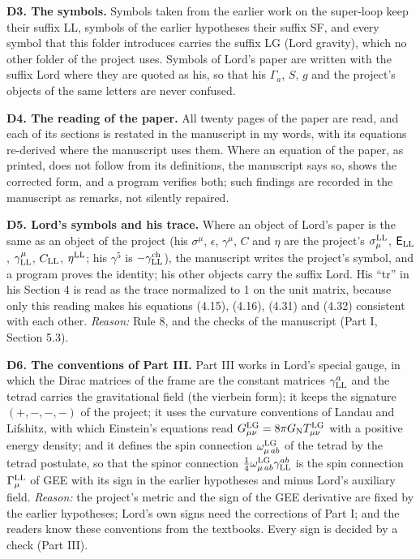 \documentclass[
  10pt,
]{article}
\begin{document}
\textbf{D3. The symbols.} Symbols taken from the earlier work on the
super-loop keep their suffix LL, symbols of the earlier hypotheses their
suffix SF, and every symbol that this folder introduces carries the
suffix LG (Lord gravity), which no other folder of the project uses.
Symbols of Lord's paper are written with the suffix Lord where they are
quoted as his, so that his \(\Gamma_a\), \(S\), \(g\) and the project's
objects of the same letters are never confused.

\textbf{D4. The reading of the paper.} All twenty pages of the paper are
read, and each of its sections is restated in the manuscript in my
words, with its equations re-derived where the manuscript uses them.
Where an equation of the paper, as printed, does not follow from its
definitions, the manuscript says so, shows the corrected form, and a
program verifies both; such findings are recorded in the manuscript as
remarks, not silently repaired.

\textbf{D5. Lord's symbols and his trace.} Where an object of Lord's
paper is the same as an object of the project (his \(\sigma^\mu\),
\(\epsilon\), \(\gamma^\mu\), \(C\) and \(\eta\) are the project's
\(\sigma^{\rm LL}_\mu\), \(\mathsf E_{\rm LL}\),
\(\gamma^\mu_{\rm LL}\), \(C_{\rm LL}\), \(\eta^{\rm LL}\); his
\(\gamma^5\) is \(-\gamma^{\rm ch}_{\rm LL}\)), the manuscript writes
the project's symbol, and a program proves the identity; his other
objects carry the suffix Lord. His ``tr'' in his Section 4 is read as
the trace normalized to 1 on the unit matrix, because only this reading
makes his equations (4.15), (4.16), (4.31) and (4.32) consistent with
each other. \emph{Reason:} Rule 8, and the checks of the manuscript
(Part I, Section 5.3).

\textbf{D6. The conventions of Part III.} Part III works in Lord's
special gauge, in which the Dirac matrices of the frame are the constant
matrices \(\gamma^a_{\rm LL}\) and the tetrad carries the gravitational
field (the vierbein form); it keeps the signature \((+,-,-,-)\) of the
project; it uses the curvature conventions of Landau and Lifshitz, with
which Einstein's equations read
\(G^{\rm LG}_{\mu\nu}=8\pi G_{\rm N}T^{\rm LG}_{\mu\nu}\) with a
positive energy density; and it defines the spin connection
\(\omega^{\rm LG}_{\mu\,ab}\) of the tetrad by the tetrad postulate, so
that the spinor connection
\(\tfrac14\omega^{\rm LG}_{\mu\,ab}\gamma^{ab}_{\rm LL}\) is the spin
connection \(\Gamma^{\rm LL}_\mu\) of GEE with its sign in the earlier
hypotheses and minus Lord's auxiliary field. \emph{Reason:} the
project's metric and the sign of the GEE derivative are fixed by the
earlier hypotheses; Lord's own signs need the corrections of Part I; and
the readers know these conventions from the textbooks. Every sign is
decided by a check (Part III).
\end{document}
